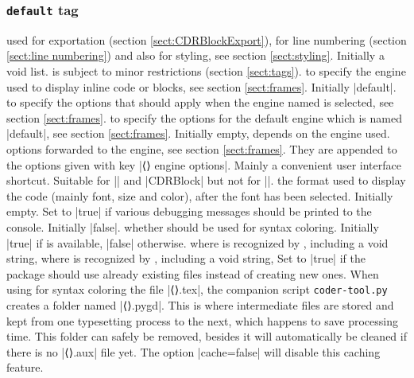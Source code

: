\documentclass{article}
\let\meta\MyMeta
\let\metatt\MyMetatt
\def\CDRCheckRed {}
\def\CDRCheckGreen {}
\begin{document}
\subsubsection{\texttt{default} tag}
\begin{description}
\itemtt[\CDRCheckGreen tags={\meta[1]{tag}|\meta[2]{tag}|...}]
used for exportation (section \ref{sect:CDRBlockExport}), for line numbering (section \ref{sect:line numbering}) and also for styling, see section \ref{sect:styling}.
Initially a void list.
 is subject to minor restrictions (section \ref{sect:tags}).
\itemtt[\CDRCheckGreen engine=\CDRMeta{engine name}]
to specify the engine used to display inline code or blocks, see section \ref{sect:frames}.
Initially \CDRCode|default|.
\itemtt[\CDRCheckRed \metatt{engine name} engine options=\CDRMeta{engine options}]
to specify the options that should apply
when the engine named  is selected, see section \ref{sect:frames}.
\itemtt[\CDRCheckGreen default engine options=\CDRMeta{engine options}]
to specify the options for the default engine which is named \CDRCode|default|, see section \ref{sect:frames}.
Initially empty, depends on the engine used.
\itemtt[\CDRCheckGreen engine options=\CDRMeta{engine options}]
options forwarded to the engine, see section \ref{sect:frames}.
They are appended to the options
given with key \CDRCode|⟨⟩ engine options|.
Mainly a convenient user interface shortcut.
Suitable for \CDRCode|\CDRCode| and \CDRCode|CDRBlock| but not for \CDRCode|\CDRSet|.
\itemtt[\CDRCheckRed format=\CDRMeta{format commands}]
the format used to display the code (mainly font, size and color),
after the font has been selected.
Initially empty.
\itemtt[\CDRCheckRed debug{[=true|false]}]
Set to \CDRCode|true| if various debugging messages should be printed to the console.
Initially \CDRCode|false|.
\itemtt[\CDRCheckRed pygments{[=true|false]}]
whether  should be used for syntax coloring.
Initially \CDRCode|true| if  is available,
\CDRCode|false| otherwise.
\itemtt[\CDRCheckRed lang=\CDRMeta{language name}]
where  is recognized by , including a void string,
\itemtt[\CDRCheckRed style=\CDRMeta{style name}]
where  is recognized by , including a void string,
\itemtt[\CDRCheckRed cache{[=true|false]}]
Set to \CDRCode|true| if the  package should use already existing files
instead of creating new ones. When using  for syntax coloring the file \CDRCode|⟨⟩.tex|, the companion script \verb|coder-tool.py| creates a folder named \CDRCode[tags=options]|⟨⟩.pygd|. This is where intermediate files are stored and kept from one typesetting process to the next, which happens to save processing time. This folder can safely be removed, besides it will automatically be cleaned if there is no \CDRCode|⟨⟩.aux| file yet.
The option \CDRCode|cache=false| will disable this caching feature.


\end{description}
\end{document}

